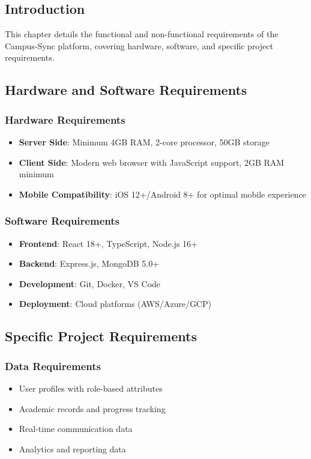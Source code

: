 \subsection{Introduction}
This chapter details the functional and non-functional requirements of the Campus-Sync platform, covering hardware, software, and specific project requirements.

\subsection{Hardware and Software Requirements}

\subsubsection{Hardware Requirements}
\begin{itemize}
\item \textbf{Server Side}: Minimum 4GB RAM, 2-core processor, 50GB storage
\item \textbf{Client Side}: Modern web browser with JavaScript support, 2GB RAM minimum
\item \textbf{Mobile Compatibility}: iOS 12+/Android 8+ for optimal mobile experience
\end{itemize}

\subsubsection{Software Requirements}
\begin{itemize}
\item \textbf{Frontend}: React 18+, TypeScript, Node.js 16+
\item \textbf{Backend}: Express.js, MongoDB 5.0+
\item \textbf{Development}: Git, Docker, VS Code
\item \textbf{Deployment}: Cloud platforms (AWS/Azure/GCP)
\end{itemize}

\subsection{Specific Project Requirements}

\subsubsection{Data Requirements}
\begin{itemize}
\item User profiles with role-based attributes
\item Academic records and progress tracking
\item Real-time communication data
\item Analytics and reporting data
\end{itemize}

